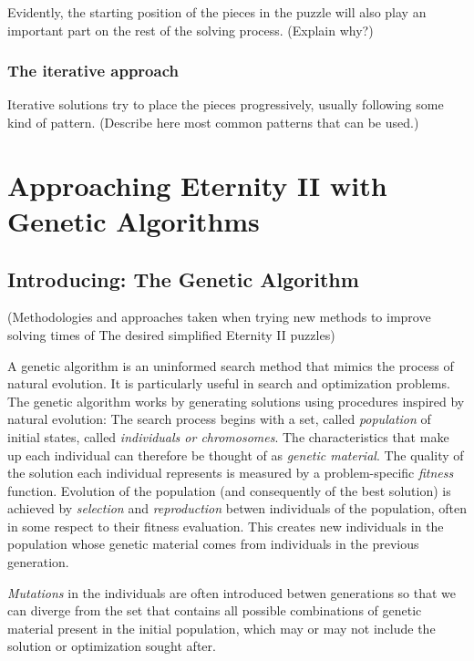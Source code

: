 \documentclass{llncs}
\begin{document}
Evidently, the starting position of the pieces in the puzzle will also play an important part on the rest of the solving process. (Explain why?)

\subsubsection{The iterative approach}\label{sec:iterative_approach}

Iterative solutions try to place the pieces progressively, usually following some kind of pattern.
(Describe here most common patterns that can be used.)

\section{Approaching Eternity II with Genetic Algorithms}\label{sec:genetic_algorithms}

\subsection{Introducing: The Genetic Algorithm}

(Methodologies and approaches taken when trying new methods to improve solving times of The desired simplified Eternity II puzzles)

A genetic algorithm is an uninformed search method that mimics the process of natural evolution. It is particularly useful in search and optimization problems. The genetic algorithm works by generating solutions using procedures inspired by natural evolution: The search process begins with a set, called \textit{population} of initial states, called \textit{individuals or chromosomes}. The characteristics that make up each individual can therefore be thought of as \textit{genetic material}. The quality of the solution each individual represents is measured by a problem-specific \textit{fitness} function. Evolution of the population (and consequently of the best solution) is achieved by \textit{selection} and \textit{reproduction} betwen individuals of the population, often in some respect to their fitness evaluation. This creates new individuals in the population whose genetic material comes from individuals in the previous generation.

\textit{Mutations} in the individuals are often introduced betwen generations so that we can diverge from the set that contains all possible combinations of genetic material present in the initial population, which may or may not include the solution or optimization sought after.
\end{document}
